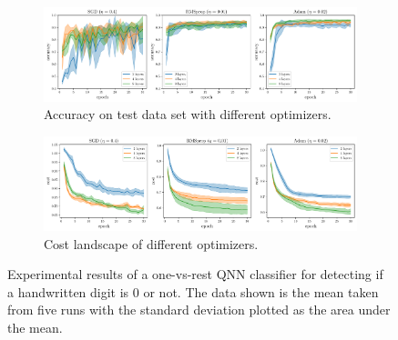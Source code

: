 \documentclass[a4paper,10pt]{article}
\begin{document}
\begin{figure}[ht]
	\centering
	\begin{subfigure}{1\textwidth}
		\centering
		\includegraphics[width=1\linewidth]{figures/qnn_ovr_accuracy.pdf}
		\caption{Accuracy on test data set with different optimizers.}
		\vspace*{4mm}
	\end{subfigure}
	\begin{subfigure}{1\textwidth}
		\centering
		\includegraphics[width=1\linewidth]{figures/qnn_ovr_cost.pdf}
		\caption{Cost landscape of different optimizers.}
	\end{subfigure}
	\caption{Experimental results of a one-vs-rest QNN classifier for detecting if a handwritten digit is 0 or not. The data shown is the mean taken from five runs with the standard deviation plotted as the area under the mean.}
	\label{fig:ovr_results}
\end{figure}
\end{document}
